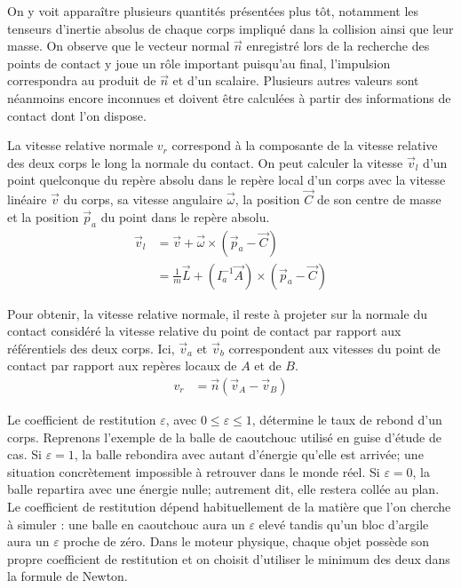 On y voit apparaître plusieurs quantités présentées plus tôt,
notamment les tenseurs d'inertie absolus de chaque corps impliqué dans
la collision ainsi que leur masse. On observe que le vecteur normal
$\vec{n}$ enregistré lors de la recherche des points de contact y joue
un rôle important puisqu'au final, l'impulsion correspondra au produit
de $\vec{n}$ et d'un scalaire. Plusieurs autres valeurs sont néanmoins
encore inconnues et doivent être calculées à partir des informations
de contact dont l'on dispose.

La vitesse relative normale $v_r$ correspond à la composante de la
vitesse relative des deux corps le long la normale du contact. On peut
calculer la vitesse $\vec{v}_l$ d'un point quelconque du repère absolu
dans le repère local d'un corps avec la vitesse linéaire $\vec{v}$ du
corps, sa vitesse angulaire $\vec{\omega}$, la position $\vec{C}$ de
son centre de masse et la position $\vec{p}_a$ du point dans le repère
absolu.
\begin{align*}
  \vec{v}_l &= \vec{v} + \vec{\omega} \times (\vec{p}_a - \vec{C}) \\
            &= \frac{1}{m} \vec{L} + (I^{-1}_a \vec{A}) \times (\vec{p}_a - \vec{C})
\end{align*}

Pour obtenir, la vitesse relative normale, il reste à projeter sur la
normale du contact considéré la vitesse relative du point de contact
par rapport aux référentiels des deux corps. Ici, $\vec{v}_a$ et
$\vec{v}_b$ correspondent aux vitesses du point de contact par rapport
aux repères locaux de $A$ et de $B$.
\begin{align*}
  v_r &= \vec{n} (\vec{v}_{A} - \vec{v}_{B})
\end{align*}

Le coefficient de restitution $\varepsilon$, avec $0 \leq \varepsilon
\leq 1$, détermine le taux de rebond d'un corps. Reprenons l'exemple
de la balle de caoutchouc utilisé en guise d'étude de cas. Si
$\varepsilon = 1$, la balle rebondira avec autant d'énergie qu'elle
est arrivée; une situation concrètement impossible à retrouver dans le
monde réel. Si $\varepsilon = 0$, la balle repartira avec une énergie
nulle; autrement dit, elle restera collée au plan. Le coefficient de
restitution dépend habituellement de la matière que l'on cherche à
simuler : une balle en caoutchouc aura un $\varepsilon$ elevé tandis
qu'un bloc d'argile aura un $\varepsilon$ proche de zéro. Dans le
moteur physique, chaque objet possède son propre coefficient de
restitution et on choisit d'utiliser le minimum des deux dans la
formule de Newton.

